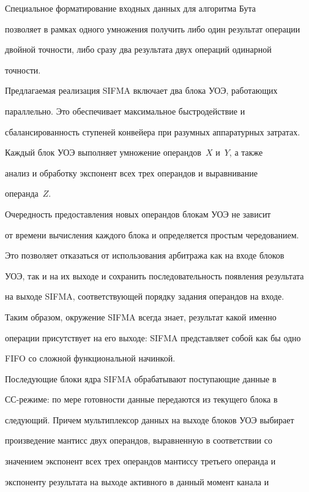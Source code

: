       Специальное форматирование входных данных для алгоритма Бута

позволяет в рамках одного умножения получить либо один результат операции

двойной точности, либо сразу два результата двух операций одинарной

точности.



      Предлагаемая реализация SIFMA включает два блока УОЭ, работающих

параллельно. Это обеспечивает максимальное быстродействие и

сбалансированность ступеней конвейера при разумных аппаратурных затратах.

Каждый блок УОЭ выполняет умножение операндов~$X$ и~$Y$, а также

анализ и обработку экспонент всех трех операндов и выравнивание

операнда~$Z$.



      Очередность предоставления новых операндов блокам УОЭ не зависит

от времени вычисления каждого блока и определяется простым чередованием.

Это позволяет отказаться от использования арбитража как на входе блоков

УОЭ, так и на их выходе и сохранить последовательность появления результата

на выходе SIFMA, соответствующей порядку задания операндов на входе.

Таким образом, окружение SIFMA всегда знает, результат какой именно

операции присутствует на его выходе: SIFMA представляет собой как бы одно

FIFO со сложной функциональной начинкой.



      Последующие блоки ядра SIFMA обрабатывают поступающие данные в

СС-ре\-жи\-ме: по мере готовности данные передаются из текущего блока в

следующий. Причем мультиплексор данных на выходе блоков УОЭ выбирает

произведение мантисс двух операндов, выравненную в соответствии со

значением экспонент всех трех операндов мантиссу третьего операнда и

экспоненту результата на выходе активного в данный момент канала и

